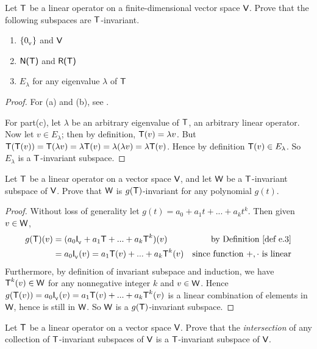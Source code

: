\begin{exercise} \label{exercise 5.4.3}
Let \(\textsf{T}\) be a linear operator on a finite-dimensional vector space \(\textsf{V}\).
Prove that the following subspaces are \(\textsf{T}\)-invariant.
\begin{enumerate}
\item \(\{ 0_{_{\textsf{V}}} \}\) and \(\textsf{V}\)
\item \(\textsf{N(T)}\) and \(\textsf{R(T)}\)
\item \(E_{\lambda}\) for any eigenvalue \(\lambda\) of \(\textsf{T}\)
\end{enumerate}
\end{exercise}

\begin{proof}
For (a) and (b), see .

For part(c), let \(\lambda\) be an arbitrary eigenvalue of \(\textsf{T}\), an arbitrary linear operator.
Now let \(v \in E_{\lambda}\); then by definition, \(\textsf{T}(v) = \lambda v\).
But \(\textsf{T}(\textsf{T}(v)) = \textsf{T}(\lambda v) = \lambda \textsf{T}(v) = \lambda (\lambda v) = \lambda \textsf{T}(v)\).
Hence by definition \(\textsf{T}(v) \in E_{\lambda}\).
So \(E_{\lambda}\) is a \(\textsf{T}\)-invariant subspace.
\end{proof}

\begin{exercise} \label{exercise 5.4.4}
Let \(\textsf{T}\) be a linear operator on a vector space \(\textsf{V}\), and let \(\textsf{W}\) be a \(\textsf{T}\)-invariant subspace of \(\textsf{V}\).
Prove that \(\textsf{W}\) is \(g(\textsf{T})\)-invariant for any polynomial \(g(t)\).
\end{exercise}

\begin{proof}
Without loss of generality let \(g(t) = a_0 + a_1 t + ... + a_k t^k\).
Then given \(v \in \textsf{W}\),
\begin{align*}
    g(\T)(v) & = (a_0 \ITRANV{} + a_1 \T + ... + a_k \T^k)(v) & \text{by \DEF{e.3}} \\
        & = a_0 \ITRANV{}(v) = a_1 \T(v) + ... + a_k \T^k(v) & \text{since function \(+, \cdot\) is linear}
\end{align*}
Furthermore, by definition of invariant subspace and induction, we have \(\textsf{T}^k(v) \in \textsf{W}\) for any nonnegative integer \(k\) and \(v \in \textsf{W}\).
Hence \(g(\textsf{T}(v)) = a_0 \textsf{I}_{_{\textsf{V}}}{}(v) = a_1 \textsf{T}(v) + ... + a_k \textsf{T}^k(v)\) is a linear combination of elements in \(\textsf{W}\), hence is still in \(\textsf{W}\).
So \(\textsf{W}\) is a \(g(\textsf{T})\)-invariant subspace.
\end{proof}

\begin{exercise} \label{exercise 5.4.5}
Let \(\textsf{T}\) be a linear operator on a vector space \(\textsf{V}\).
Prove that the \emph{intersection} of any collection of \(\textsf{T}\)-invariant subspaces of \(\textsf{V}\) is a \(\textsf{T}\)-invariant subspace of \(\textsf{V}\).
\end{exercise}


